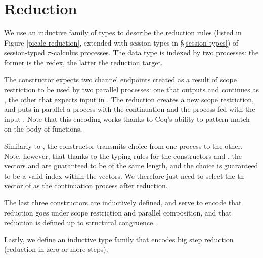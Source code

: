 \documentclass{mproj}
\newcommand{\picalc}{$\pi$-calculus}
\begin{document}

\section{Reduction}\label{reduction}

We use an inductive family of types to describe the reduction rules (listed in Figure \ref{picalc-reduction}, extended with session types in \S \ref{session-types}) of session-typed \picalc{} processes. The data type is indexed by two processes: the former is the redex, the latter the reduction target. 


The  constructor expects two channel endpoints created as a result of scope restriction to be used by two parallel processes: one that outputs  and continues as , the other that expects input in . The reduction creates a new scope restriction, and puts in parallel a process with the continuation  and the process  fed with the input . Note that this encoding works thanks to Coq's ability to pattern match on the body of functions.


Similarly to , the  constructor transmits choice from one process to the other. Note, however, that thanks to the typing rules for the constructors  and , the vectors  and  are guaranteed to be of the same length, and the choice  is guaranteed to be a valid index within the vectors. We therefore just need to select the th vector of  as the continuation process after reduction.


The last three constructors are inductively defined, and serve to encode that reduction goes under scope restriction and parallel composition, and that reduction is defined up to structural congruence.


Lastly, we define an inductive type family that encodes big step reduction (reduction in zero or more steps):

\end{document}
